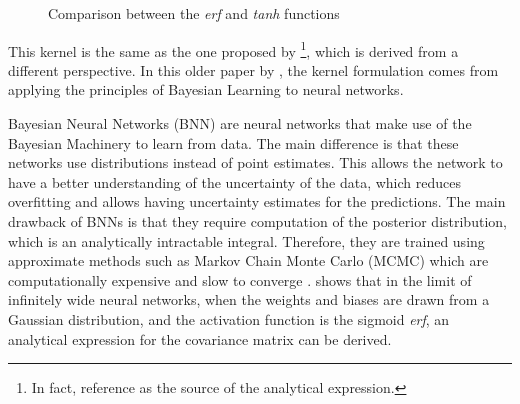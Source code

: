 \begin{figure}[htpb]
    \caption{Comparison between the \emph{erf} and \emph{tanh} functions}
    \label{fig:erf}
\end{figure}

This kernel is the same as the one proposed by
\textcite{williamsComputationInfiniteNeural1998}\footnote{ In fact,
    \textcite{frenayParameterinsensitiveKernelExtreme2011} reference
    \textcite{williamsComputationInfiniteNeural1998} as the source of the
    analytical expression.
}, which is derived from a different perspective. In this older paper by
\citeauthor{williamsComputationInfiniteNeural1998}, the kernel formulation comes
from applying the principles of Bayesian Learning to neural
networks\cite{nealBayesianLearningNeural1996,bishopBayesianNeuralNetworks1997}.

Bayesian Neural Networks (BNN) are neural networks that make use of the Bayesian
Machinery to learn from data. The main difference is that these networks use
distributions instead of point estimates\cite{nealBayesianLearningNeural1996}.
This allows the network to have a better understanding of the uncertainty of the
data, which reduces overfitting and allows having uncertainty estimates for the
predictions. The main drawback of BNNs is that they require computation of the
posterior distribution, which is an analytically intractable integral.
Therefore, they are trained using approximate methods such as Markov Chain Monte
Carlo (MCMC) which are computationally expensive and slow to converge
\cite{nealBayesianTrainingBackpropagation1992}.
\Textcite{williamsComputationInfiniteNeural1998} shows that in the limit of
infinitely wide neural networks, when the weights and biases are drawn from a
Gaussian distribution, and the activation function is the sigmoid \emph{erf}, an
analytical expression for the covariance matrix can be derived.

